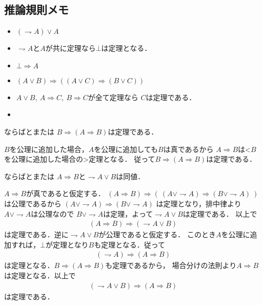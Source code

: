 \subsection{推論規則メモ}
	\begin{screen}
		\begin{itemize}
			\item $(\rightharpoondown A) \vee A$
			\item $\rightharpoondown A$と$A$が共に定理なら$\bot$は定理となる．
			\item $\bot \Longrightarrow A$
			\item $(A \vee B) \Longrightarrow ((A \vee C) \Longrightarrow (B \vee C))$
			\item $A \vee B,\ A \Longrightarrow C,\ B \Longrightarrow C$が全て定理なら
				$C$は定理である．
			\item 
		\end{itemize}
	\end{screen}
	
	\begin{itembox}[l]{ならばとまたは}
		$B \Longrightarrow (A \Longrightarrow B)$は定理である．
	\end{itembox}
	
	\begin{prf}
		$B$を公理に追加した場合，$A$を公理に追加しても$B$は真であるから
		$A \Longrightarrow B$は<$B$を公理に追加した場合の>定理となる．
		従って$B \Longrightarrow (A \Longrightarrow B)$は定理である．
	\end{prf}
	
	\begin{itembox}[l]{ならばとまたは}
		$A \Longrightarrow B$と$\rightharpoondown A \vee B$は同値．
	\end{itembox}
	
	\begin{prf}
		$A \Longrightarrow B$が真であると仮定する．
		$(A \Longrightarrow B) \Longrightarrow (\ (A \vee \rightharpoondown A) \Longrightarrow (B \vee \rightharpoondown A)\ )$は公理であるから
		$(A \vee \rightharpoondown A) \Longrightarrow (B \vee \rightharpoondown A)$
		は定理となり，排中律より$A \vee \rightharpoondown A$は公理なので
		$B \vee \rightharpoondown A$は定理，よって$\rightharpoondown A \vee B$は定理である．
		以上で
		\begin{align}
			(A \Longrightarrow B) \Longrightarrow (\rightharpoondown A \vee B)
		\end{align}
		は定理である．逆に$\rightharpoondown A \vee B$が公理であると仮定する．
		このとき$A$を公理に追加すれば，$\bot$が定理となり$B$も定理となる．従って
		\begin{align}
			(\rightharpoondown A) \Longrightarrow (A \Longrightarrow B)
		\end{align}
		は定理となる．$B \Longrightarrow (A \Longrightarrow B)$も定理であるから，
		場合分けの法則より$A \Longrightarrow B$は定理となる．以上で
		\begin{align}
			(\rightharpoondown A \vee B) \Longrightarrow (A \Longrightarrow B)
		\end{align}
		は定理である．
	\end{prf}
	
